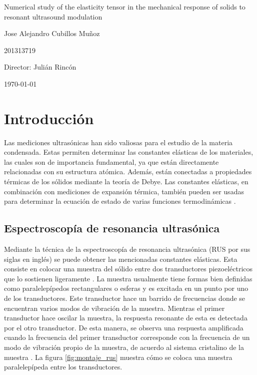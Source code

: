 \documentclass[12pt]{article}
\begin{document}
\begin{center}
\Huge
Numerical study of the elasticity tensor in the mechanical response of solids to resonant ultrasound modulation

\vspace{3mm}
\Large Jose Alejandro Cubillos Muñoz

\large
201313719


\vspace{2mm}
\Large
Director: Julián Rincón

\normalsize
\vspace{2mm}

\today
\end{center}


\normalsize
\section{Introducción}

Las mediciones ultrasónicas han sido valiosas para el estudio de la materia condensada. Estas permiten determinar las constantes elásticas de los materiales, las cuales son de importancia fundamental, ya que están directamente relacionadas con su estructura atómica. Además, están conectadas a propiedades térmicas de los sólidos mediante la teoría de Debye. Las constantes elásticas, en combinación con mediciones de expansión térmica, también pueden ser usadas para determinar la ecuación de estado de varias funciones termodinámicas \cite{Leisure_1997}.

\subsection {Espectroscopía de resonancia ultrasónica}

Mediante la técnica de la espectroscopía de resonancia ultrasónica (RUS por sus siglas en inglés) se puede obtener las mencionadas constantes elásticas. Esta consiste en colocar una muestra del sólido entre dos transductores piezoeléctricos que lo sostienen ligeramente \cite{MIGLIORI19931}. La muestra usualmente tiene formas bien definidas como paralelepípedos rectangulares o esferas y es excitada en un punto por uno de los transductores. Este transductor hace un barrido de frecuencias donde se encuentran varios modos de vibración de la muestra. Mientras el primer transductor hace oscilar la muestra, la respuesta resonante de esta es detectada por el otro transductor. De esta manera, se observa una respuesta amplificada cuando la frecuencia del primer transductor corresponde con la frecuencia de un modo de vibración propio de la muestra, de acuerdo al sistema cristalino de la muestra \cite{Leisure_1997}. La figura \ref{fig:montaje_rus} muestra cómo se coloca una muestra paralelepípeda entre los transductores.
\end{document}
